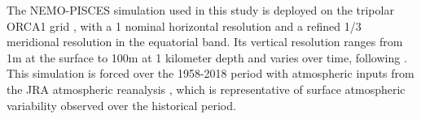 The NEMO-PISCES simulation used in this study is deployed on the tripolar ORCA1 grid \citep{madecGlobalOceanMesh1996}, with a 1\degree{} nominal horizontal resolution and a refined 1/3\degree{} meridional resolution in the equatorial band. Its vertical resolution ranges from 1m at the surface to 100m at 1 kilometer depth and varies over time, following \cite{levierFreeSurfaceVariable2007}. This simulation  is forced over the 1958-2018 period with atmospheric inputs from the JRA atmospheric reanalysis \citep{kobayashiJRA55ReanalysisGeneral2015}, which is representative of  surface atmospheric variability observed over the historical period. 

